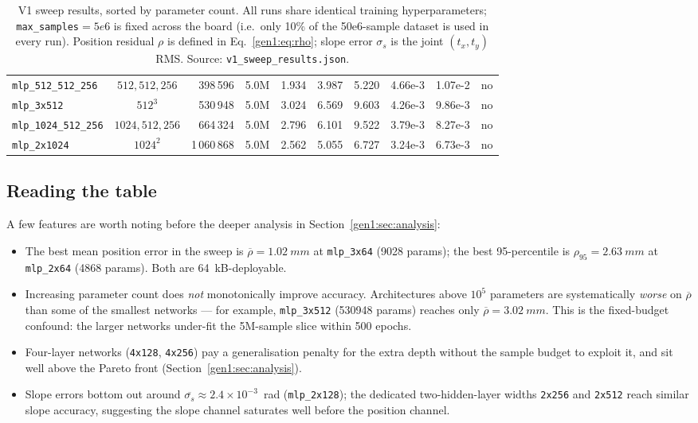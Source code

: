 \documentclass[a4paper,11pt]{article}
\newcommand{\SI}[2]{#1~#2}
\newcommand{\num}[1]{#1}
\newcommand{\kilo}{k}
\newcommand{\byte}{B}
\newcommand{\mm}{mm}
\begin{document}
\begin{table}[h]
\begin{tabular}{lcrrrrrrrc}
\texttt{mlp\_512\_512\_256}& $512,512,256$  &  398\,596 & 5.0M & 1.934 & 3.987 & 5.220 & 4.66e-3 & 1.07e-2 & no\\
\texttt{mlp\_3x512}        & $512^3$        &  530\,948 & 5.0M & 3.024 & 6.569 & 9.603 & 4.26e-3 & 9.86e-3 & no\\
\texttt{mlp\_1024\_512\_256}& $1024,512,256$&  664\,324 & 5.0M & 2.796 & 6.101 & 9.522 & 3.79e-3 & 8.27e-3 & no\\
\texttt{mlp\_2x1024}       & $1024^2$       & 1\,060\,868 & 5.0M & 2.562 & 5.055 & 6.727 & 3.24e-3 & 6.73e-3 & no\\
\bottomrule
\end{tabular}
\caption{V1 sweep results, sorted by parameter count. All runs share
  identical training hyperparameters; \texttt{max\_samples}$=\num{5e6}$ is
  fixed across the board (i.e.\ only 10\% of the \num{50e6}-sample
  dataset is used in every run). Position residual $\rho$ is defined in
  Eq.~\eqref{gen1:eq:rho}; slope error $\sigma_s$ is the joint
  $(t_x,t_y)$ RMS. Source: \texttt{v1\_sweep\_results.json}.}
\label{gen1:tab:sweep}
\end{table}

\subsection{Reading the table}

A few features are worth noting before the deeper analysis in
Section~\ref{gen1:sec:analysis}:

\begin{itemize}\setlength{\itemsep}{2pt}
\item The best mean position error in the sweep is
  $\overline{\rho}=\SI{1.02}{\mm}$ at \texttt{mlp\_3x64} (9028 params);
  the best 95-percentile is $\rho_{95}=\SI{2.63}{\mm}$ at
  \texttt{mlp\_2x64} (4868 params).  Both are \SI{64}{\kilo\byte}-deployable.
\item Increasing parameter count does \emph{not} monotonically improve
  accuracy. Architectures above $10^5$ parameters are systematically
  \emph{worse} on $\overline{\rho}$ than some of the smallest networks ---
  for example, \texttt{mlp\_3x512} (\num{530948} params) reaches only
  $\overline{\rho}=\SI{3.02}{\mm}$.  This is the fixed-budget confound:
  the larger networks under-fit the 5M-sample slice within 500 epochs.
\item Four-layer networks (\texttt{4x128}, \texttt{4x256}) pay a
  generalisation penalty for the extra depth without the sample budget
  to exploit it, and sit well above the Pareto front
  (Section~\ref{gen1:sec:analysis}).
\item Slope errors bottom out around $\overline{\sigma_s}\approx
  2.4\!\times\!10^{-3}$~rad (\texttt{mlp\_2x128}); the dedicated
  two-hidden-layer widths \texttt{2x256} and \texttt{2x512} reach
  similar slope accuracy, suggesting the slope channel saturates well
  before the position channel.
\end{itemize}
\end{document}
